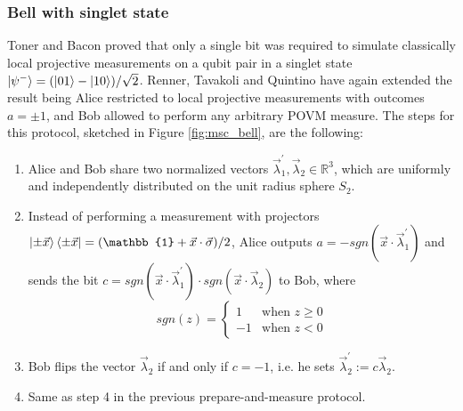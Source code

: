 \subsubsection{Bell with singlet state}\label{section:protocol_bell}
Toner and Bacon \cite{toner2003} proved that only a single bit was required to simulate classically local projective measurements on a qubit pair in a singlet state $\ket{\psi^{-}}=(\ket{01} - \ket{10})/\sqrt{2}$. Renner, Tavakoli and Quintino \cite{renner2023} have again extended the result being Alice restricted to local projective measurements with outcomes $a=\pm 1$, and Bob allowed to perform any arbitrary POVM measure. The steps for this protocol, sketched in Figure \ref{fig:msc_bell}, are the following:
\begin{enumerate}
 \item Alice and Bob share two normalized vectors $\vec{\lambda}_1^{\prime}, \vec{\lambda}_2 \in \mathbb{R}^{3}$, which are uniformly and independently distributed on the unit radius sphere $S_2$.
 \item Instead of performing a measurement with projectors $\ket{\pm\vec{x}}\bra{\pm\vec{x}} = (\mathbb{1} + \vec{x} \cdot \vec{\sigma})/2$, Alice outputs $a = -sgn(\vec{x} \cdot \vec{\lambda}^{\prime}_1)$ and sends the bit $c = sgn(\vec{x} \cdot \vec{\lambda}^{\prime}_1) \cdot sgn(\vec{x} \cdot \vec{\lambda}_2)$ to Bob, where 
 \begin{equation}
sgn(z) =
    \begin{cases}
      1 & \text{when $z \ge 0$}\\
      -1 & \text{when $z<0$}
    \end{cases} 
\end{equation}
 \item Bob flips the vector $\vec{\lambda}_2$ if and only if $c=-1$, i.e. he sets $\vec{\lambda}^{\prime}_{2} := c \vec{\lambda}_{2}$.
 \item Same as step 4 in the previous prepare-and-measure protocol.
\end{enumerate}

